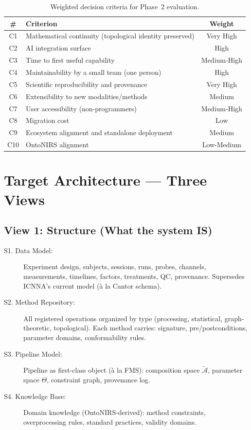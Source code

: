 \documentclass[11pt,a4paper]{article}
\begin{document}
\begin{table}[h]
\centering
\begin{tabular}{clc}
\toprule
\textbf{\#} & \textbf{Criterion} & \textbf{Weight} \\
\midrule
C1 & Mathematical continuity (topological identity preserved) & Very High \\
C2 & AI integration surface & High \\
C3 & Time to first useful capability & Medium-High \\
C4 & Maintainability by a small team (one person) & High \\
C5 & Scientific reproducibility and provenance & Very High \\
C6 & Extensibility to new modalities/methods & Medium \\
C7 & User accessibility (non-programmers) & Medium-High \\
C8 & Migration cost & Low \\
C9 & Ecosystem alignment and standalone deployment & Medium \\
C10 & OntoNIRS alignment & Low-Medium \\
\bottomrule
\end{tabular}
\caption{Weighted decision criteria for Phase~2 evaluation.}
\end{table}

\section{Target Architecture --- Three Views}

\subsection{View 1: Structure (What the system IS)}
\begin{description}
    \item[S1. Data Model:] Experiment design, subjects, sessions, runs, probes, channels, measurements, timelines, factors, treatments, QC, provenance. Supersedes ICNNA's current model (\`a la Cantor schema).
    \item[S2. Method Repository:] All registered operations organized by type (processing, statistical, graph-theoretic, topological). Each method carries: signature, pre/postconditions, parameter domains, conformability rules.
    \item[S3. Pipeline Model:] Pipeline as first-class object (\`a la FMS): composition space $\tilde{\mathcal{A}}$, parameter space $\Theta$, constraint graph, provenance log.
    \item[S4. Knowledge Base:] Domain knowledge (OntoNIRS-derived): method constraints, overprocessing rules, standard practices, validity domains.
\end{description}
\end{document}
